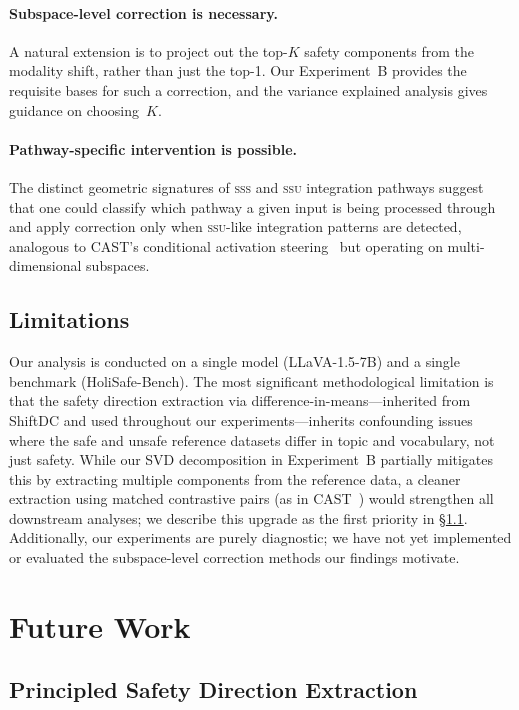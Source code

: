 \documentclass{article}
\newcommand{\ssu}{\textsc{ssu}}
\newcommand{\sss}{\textsc{sss}}
\begin{document}
\paragraph{Subspace-level correction is necessary.}
A natural extension is to project out the top-$K$ safety components from the
modality shift, rather than just the top-1.  Our Experiment~B provides the
requisite bases for such a correction, and the variance explained analysis gives
guidance on choosing~$K$.

\paragraph{Pathway-specific intervention is possible.}
The distinct geometric signatures of \sss{} and \ssu{} integration pathways
suggest that one could classify which pathway a given input is being processed
through and apply correction only when \ssu-like integration patterns are
detected, analogous to CAST's conditional activation steering~\citep{bai2024cast}
but operating on multi-dimensional subspaces.

\subsection{Limitations}

Our analysis is conducted on a single model (LLaVA-1.5-7B) and a single
benchmark (HoliSafe-Bench).  The most significant methodological limitation is
that the safety direction extraction via difference-in-means---inherited from
ShiftDC and used throughout our experiments---inherits confounding issues where
the safe and unsafe reference datasets differ in topic and vocabulary, not just
safety.  While our SVD decomposition in Experiment~B partially mitigates this by
extracting multiple components from the reference data, a cleaner extraction using
matched contrastive pairs (as in CAST~\citep{bai2024cast}) would strengthen all
downstream analyses; we describe this upgrade as the first priority in
\S\ref{sec:future_direction}.  Additionally, our experiments are purely
diagnostic; we have not yet implemented or evaluated the subspace-level correction
methods our findings motivate.

\section{Future Work}
\label{sec:future}

\subsection{Principled Safety Direction Extraction}
\label{sec:future_direction}
\end{document}
